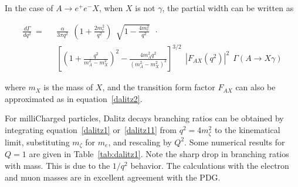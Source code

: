 \documentclass[12pt]{article}
\begin{document}
In the case of $A \to e^+ e^- X$, when $X$ is not $\gamma$, the
partial width can be written as 

\begin{equation}
\begin{split}
\frac{d \Gamma}{d q^2}  ~=~~~ & \frac{\alpha}{3 \pi q^2}~~
(1+\frac{2m_e^2}{q^2})~~\sqrt{1 - \frac{4m_e^2}{q^2}}~~ \cdot \\
& \left [ (1+\frac{q^2}{m_A^2-m_X^2})^2 - \frac{4
    m_A^2q^2}{(m_A^2-m_X^2)^2}\right ]^{3/2}~~
|F_{AX}(q^2)|^2 ~~
\Gamma(A \to X \gamma) 
\label{dalitz11}
\end{split}
\end{equation}

\noindent where $m_X$ is the mass of $X$, and the
transition
form factor $F_{AX}$ can also be approximated as in equation~\ref{dalitz2}.

For milliCharged particles, Dalitz decays branching ratios 
can be obtained by integrating equation~\ref{dalitz1} or~\ref{dalitz11}
from 
$q^2=4m^2_\zeta$ to the kinematical limit, substituting $m_\zeta$ for 
$m_e$, and rescaling by $Q^2$.
Some numerical results for $Q=1$ are given in Table~\ref{tab:dalitz1}.  Note the
sharp drop in branching ratios with mass.  This is due to the $1/q^2$ behavior.
The calculations
with the electron and muon masses are in excellent agreement with the PDG.
\end{document}
